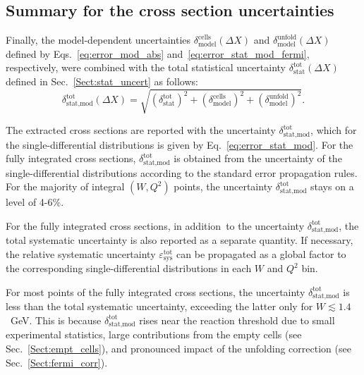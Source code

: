 \documentclass[prc,twocolumn,superscriptaddress,showpacs,amssymb,amsmath,amsfonts,aps,nofootinbib]{revtex4-1}
\begin{document}
\subsection{Summary for the cross section uncertainties}
\label{Sect:uncert_resume}

Finally, the model-dependent uncertainties $\delta^{\text{cells}}_{\text{model}}(\Delta X)$ and $\delta^{\text{unfold}}_{\text{model}}(\Delta X)$ defined by Eqs.\!~\eqref{eq:error_mod_abs} and\!~\eqref{eq:error_stat_mod_fermi}, respectively, were combined with the total statistical uncertainty $\delta_{\text{stat}}^{\text{tot}}(\Delta X)$ defined in Sec.\!~\ref{Sect:stat_uncert} as follows:
\begin{equation}
\delta_{\text{stat,mod}}^{\text{tot}} (\Delta X) =
\sqrt{\left (\delta_{\text{stat}}^{\text{tot}} \right )^{2} + \left (\delta^{\text{cells}}_{\text{model}}\right )^{2} + \left (\delta^{\text{unfold}}_{\text{model}}\right )^{2}}.
\label{eq:error_stat_mod}
\end{equation}


The extracted cross sections are reported with the uncertainty $\delta_{\text{stat,mod}}^{\text{tot}}$, which for the single-differential distributions is given by Eq.\!~\eqref{eq:error_stat_mod}. For the fully integrated cross sections, $\delta_{\text{stat,mod}}^{\text{tot}}$ is obtained from the uncertainty of the single-differential distributions according to the standard error propagation rules. For the majority of integral $(W,Q^{2})$ points, the uncertainty $\delta_{\text{stat,mod}}^{\text{tot}}$ stays on a level of 4-6\%.


For the fully integrated cross sections, in addition~to the uncertainty $\delta_{\text{stat,mod}}^{\text{tot}}$, the total systematic uncertainty is also reported as a separate quantity. If necessary, the relative systematic uncertainty $\varepsilon_{\text{sys}}^{\text{tot}}$ can be propagated as a global factor to the corresponding single-differential distributions in each $W$ and $Q^{2}$ bin.


For most points of the fully integrated cross sections, the uncertainty $\delta_{\text{stat,mod}}^{\text{tot}}$ is less than the total systematic uncertainty, exceeding the latter only for $W \lesssim 1.4$~GeV. This is because $\delta_{\text{stat,mod}}^{\text{tot}}$ rises near the reaction threshold due to small experimental statistics, large contributions from the empty cells (see Sec.\!~\ref{Sect:empt_cells}), and pronounced impact of the unfolding correction (see Sec.\!~\ref{Sect:fermi_corr}).
\end{document}
